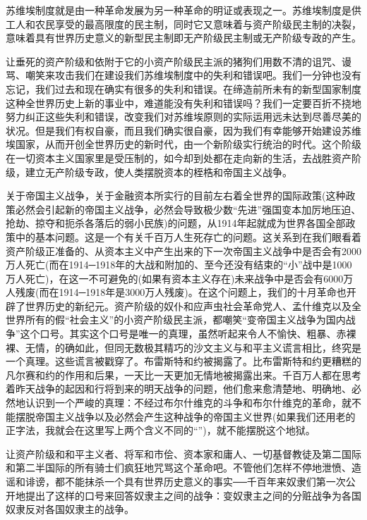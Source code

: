 \documentclass[UTF8, 12pt, a4paper]{ctexrep}
\begin{document}
苏维埃制度就是由一种革命发展为另一种革命的明证或表现之一。苏维埃制度是供工人和农民享受的最高限度的民主制，同时它又意味着与资产阶级民主制的决裂，意味着具有世界历史意义的新型民主制即无产阶级民主制或无产阶级专政的产生。

让垂死的资产阶级和依附于它的小资产阶级民主派的猪狗们用数不清的诅咒、谩骂、嘲笑来攻击我们在建设我们苏维埃制度中的失利和错误吧。我们一分钟也没有忘记，我们过去和现在确实有很多的失利和错误。在缔造前所未有的新型国家制度这种全世界历史上新的事业中，难道能没有失利和错误吗？我们一定要百折不挠地努力纠正这些失利和错误，改变我们对苏维埃原则的实际运用远未达到尽善尽美的状况。但是我们有权自豪，而且我们确实很自豪，因为我们有幸能够开始建设苏维埃国家，从而开创全世界历史的新时代，由一个新阶级实行统治的时代。这个阶级在一切资本主义国家里是受压制的，如今却到处都在走向新的生活，去战胜资产阶级，建立无产阶级专政，使人类摆脱资本的桎梏和帝国主义战争。

关于帝国主义战争，关于金融资本所实行的目前左右着全世界的国际政策(这种政策必然会引起新的帝国主义战争，必然会导致极少数“先进”强国变本加厉地压迫、抢劫、掠夺和扼杀各落后的弱小民族)的问题，从1914年起就成为世界各国全部政策中的基本问题。这是一个有关千百万人生死存亡的问题。这关系到在我们眼看着资产阶级正准备的、从资本主义中产生出来的下一次帝国主义战争中是否会有2000万人死亡(而在1914─1918年的大战和附加的、至今还没有结束的“小”战中是1000万人死亡)，在这一不可避免的(如果有资本主义存在)未来战争中是否会有6000万人残废(而在1914─1918年是3000万人残废)。在这个问题上，我们的十月革命也开辟了世界历史的新纪元。资产阶级的奴仆和应声虫社会革命党人、孟什维克以及全世界所有的假“社会主义”的小资产阶级民主派，都嘲笑“变帝国主义战争为国内战争”这个口号。其实这个口号是唯一的真理，虽然听起来令人不愉快、粗暴、赤裸裸、无情，的确如此，但同无数极其精巧的沙文主义与和平主义谎言相比，终究是一个真理。这些谎言被戳穿了。布雷斯特和约被揭露了。比布雷斯特和约更糟糕的凡尔赛和约的作用和后果，一天比一天更加无情地被揭露出来。千百万人都在思考着昨天战争的起因和行将到来的明天战争的问题，他们愈来愈清楚地、明确地、必然地认识到一个严峻的真理：不经过布尔什维克的斗争和布尔什维克的革命，就不能摆脱帝国主义战争以及必然会产生这种战争的帝国主义世界(如果我们还用老的正字法，我就会在这里写上两个含义不同的“”)，就不能摆脱这个地狱。

让资产阶级和和平主义者、将军和市侩、资本家和庸人、一切基督教徒及第二国际和第二半国际的所有骑士们疯狂地咒骂这个革命吧。不管他们怎样不停地泄愤、造谣和诽谤，都不能抹杀一个具有世界历史意义的事实──千百年来奴隶们第一次公开地提出了这样的口号来回答奴隶主之间的战争：变奴隶主之间的分赃战争为各国奴隶反对各国奴隶主的战争。
\end{document}
